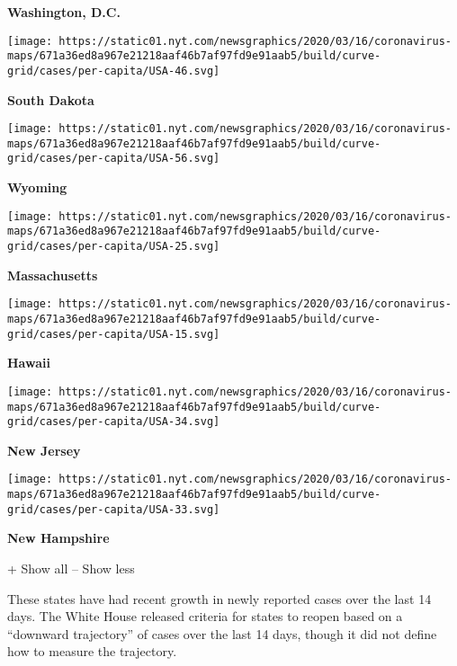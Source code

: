 \textbf{Washington, D.C.}

\href{https://www.nytimes.com/interactive/2020/us/south-dakota-coronavirus-cases.html}{}

\texttt{[image: https://static01.nyt.com/newsgraphics/2020/03/16/coronavirus-maps/671a36ed8a967e21218aaf46b7af97fd9e91aab5/build/curve-grid/cases/per-capita/USA-46.svg]}

\textbf{South Dakota}

\href{https://www.nytimes.com/interactive/2020/us/wyoming-coronavirus-cases.html}{}

\texttt{[image: https://static01.nyt.com/newsgraphics/2020/03/16/coronavirus-maps/671a36ed8a967e21218aaf46b7af97fd9e91aab5/build/curve-grid/cases/per-capita/USA-56.svg]}

\textbf{Wyoming}

\href{https://www.nytimes.com/interactive/2020/us/massachusetts-coronavirus-cases.html}{}

\texttt{[image: https://static01.nyt.com/newsgraphics/2020/03/16/coronavirus-maps/671a36ed8a967e21218aaf46b7af97fd9e91aab5/build/curve-grid/cases/per-capita/USA-25.svg]}

\textbf{Massachusetts}

\href{https://www.nytimes.com/interactive/2020/us/hawaii-coronavirus-cases.html}{}

\texttt{[image: https://static01.nyt.com/newsgraphics/2020/03/16/coronavirus-maps/671a36ed8a967e21218aaf46b7af97fd9e91aab5/build/curve-grid/cases/per-capita/USA-15.svg]}

\textbf{Hawaii}

\href{https://www.nytimes.com/interactive/2020/us/new-jersey-coronavirus-cases.html}{}

\texttt{[image: https://static01.nyt.com/newsgraphics/2020/03/16/coronavirus-maps/671a36ed8a967e21218aaf46b7af97fd9e91aab5/build/curve-grid/cases/per-capita/USA-34.svg]}

\textbf{New Jersey}

\href{https://www.nytimes.com/interactive/2020/us/new-hampshire-coronavirus-cases.html}{}

\texttt{[image: https://static01.nyt.com/newsgraphics/2020/03/16/coronavirus-maps/671a36ed8a967e21218aaf46b7af97fd9e91aab5/build/curve-grid/cases/per-capita/USA-33.svg]}

\textbf{New Hampshire}

+ Show all -- Show less

These states have had recent growth in newly reported cases over the
last 14 days. The White House released criteria for states to reopen
based on a ``downward trajectory'' of cases over the last 14 days,
though it did not define how to measure the trajectory.

